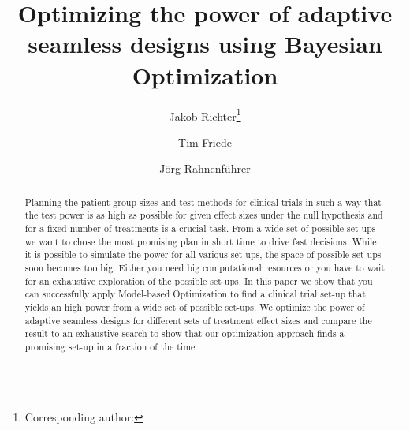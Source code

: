 \documentclass[bimj,fleqn]{w-art}
\theoremstyle{plain}
\theoremstyle{definition}
\begin{document}

\title[Model-based Optimization of Adaptive Seamless Designs]{Optimizing the power of adaptive seamless designs using Bayesian Optimization} %
\author[Jakob Richter {\it{et al.}}]{Jakob Richter\footnote{Corresponding author: {}}} 
\address[\inst{1}]{Fakultät Statistik, Technische Universität Dortmund, 44221 Dortmund}
\author[dd]{Tim Friede}
\address[\inst{2}]{Institut für Medizinische Statistik, Universitätsmedizin Göttingen, 37073 Göttingen}
\author[]{Jörg Rahnenführer} %
   

\begin{abstract}
Planning the patient group sizes and test methods for clinical trials in such a way that the test power is as high as possible for given effect sizes under the null hypothesis and for a fixed number of treatments is a crucial task.
From a wide set of possible set ups we want to chose the most promising plan in short time to drive fast decisions.
While it is possible to simulate the power for all various set ups, the space of possible set ups soon becomes too big.
Either you need big computational resources or you have to wait for an exhaustive exploration of the possible set ups.
In this paper we show that you can successfully apply Model-based Optimization to find a clinical trial set-up that yields an high power from a wide set of possible set-ups.
We optimize the power of adaptive seamless designs for different sets of treatment effect sizes and compare the result to an exhaustive search to show that our optimization approach finds a promising set-up in a fraction of the time.
\end{abstract}
\end{document}
